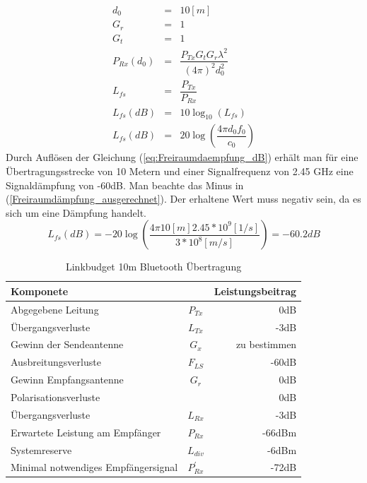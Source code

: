 \begin{eqnarray}
  	d_{0} 	&=& 10 [m] \\ \label{eq:d0_LinkBudget}
  G_r		&=& 1 \\ \label{eq:Gr_LinkBudget}
	G_t 		&=& 1 \\ \label{eq:Gt_LinkBudget}
  P_{Rx}(d_0) 	&=& \dfrac{P_{Tx}G_t G_r\lambda^2}{(4\pi)^2 d_0^2} \\ \label{eq:Prx_LinkBudget}
  L_{fs} 		&=& \dfrac{P_{Tx}}{P_{Rx}} \\ \label{eq:Freiraumdaempfung}
  L_{fs}(dB) 	&=& 10\log_{10}(L_{fs}) \\ \label{eq:Freiraumdaempfung_dB}
  L_{fs}(dB) 	&=& 20\log(\dfrac{4\pi d_0 f_0}{c_0}) \label{eq:Freiraumdaempfung_dB_aufgelöst} 
\end{eqnarray}
Durch Auflösen der Gleichung (\ref{eq:Freiraumdaempfung_dB}) erhält man für eine Übertragungsstrecke von 10 Metern und einer Signalfrequenz von 2.45 GHz eine Signaldämpfung von -60dB. Man beachte das Minus in (\ref{Freiraumdämpfung_ausgerechnet}). Der erhaltene Wert muss negativ sein, da es sich um eine Dämpfung handelt.
\begin{equation}\label{Freiraumdämpfung_ausgerechnet}
  L_{fs}(dB) = -20\log(\dfrac{4\pi 10[m] 2.45*10^9 [1/s] }{3*10^8[m/s]}) =-60.2dB
\end{equation}

\begin{table}[!ht]
 \centering
 \begin{tabular}{l c r} \toprule 
 Komponete               	& 			&Leistungsbeitrag  \\ \midrule
  Abgegebene Leitung    			&$P_{Tx}$ 	& 0dB       \\
  Übergangsverluste              &$L_{Tx}$	& -3dB       \\
  Gewinn der Sendeantenne    	&$G_{x}$		& zu bestimmen        \\
  Ausbreitungsverluste   		& $F_{LS}$	& -60dB        \\
  Gewinn Empfangsantenne  		& $G_{r}$	& 0dB           \\
  Polarisationsverluste          & 	& 0dB            \\
  Übergangsverluste              & $L_{Rx}$	& -3dB            \\
  Erwartete Leistung am Empfänger & $P_{Rx}$  & -66dBm \cite{CC2541} \\ \midrule
  Systemreserve        			 & $L_{div}$&-6dBm \\ 
  Minimal notwendiges Empfängersignal &$P_{Rx}^{'}$ & -72dB \\ \bottomrule
  \end{tabular}
  \caption{Linkbudget 10m Bluetooth Übertragung}
  \label{tab:Linkbudget}
\end{table}

